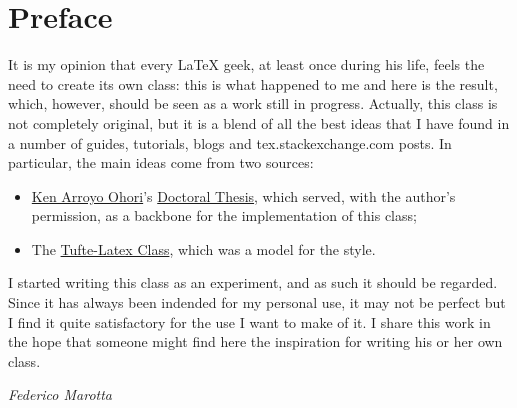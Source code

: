 \chapter*{Preface}

It is my opinion that every \LaTeX\xspace geek, at least once during his 
life, feels the need to create its own class: this is what happened to 
me and here is the result, which, however, should be seen as a work 
still in progress. Actually, this class is not completely original, but 
it is a blend of all the best ideas that I have found in a number of 
guides, tutorials, blogs and tex.stackexchange.com posts. In particular, 
the main ideas come from two sources:

\begin{itemize}
	\item \href{https://3d.bk.tudelft.nl/ken/en/}{Ken Arroyo Ohori}'s 
		\href{ttps://3d.bk.tudelft.nl/ken/en/nl/ken/en/2016/04/17/a-1.5-column-layout-in-latex.html}{Doctoral 
			Thesis}, which served, with the author's permission, as a 
		backbone for the implementation of this class;
	\item The 
		\href{https://github.com/Tufte-LaTeX/tufte-latex}{Tufte-Latex 
			Class}, which was a model for the style.
\end{itemize}

I started writing this class as an experiment, and as such it should be 
regarded. Since it has always been indended for my personal use, it may 
not be perfect but I find it quite satisfactory for the use I want to 
make of it. I share this work in the hope that someone might find here 
the inspiration for writing his or her own class.

\begin{flushright}
	\textit{Federico Marotta}
\end{flushright}
